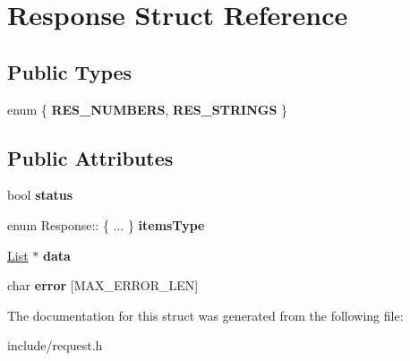 \hypertarget{struct_response}{}\section{Response Struct Reference}
\label{struct_response}
\subsection*{Public Types}
\begin{DoxyCompactItemize}
\item 
\mbox{\label{struct_response_a94f56f09486776e06ded23d740b31097}} 
enum \{ {\bfseries R\+E\+S\+\_\+\+N\+U\+M\+B\+E\+RS}, 
{\bfseries R\+E\+S\+\_\+\+S\+T\+R\+I\+N\+GS}
 \}
\end{DoxyCompactItemize}
\subsection*{Public Attributes}
\begin{DoxyCompactItemize}
\item 
\mbox{\label{struct_response_afbbc48eb7e4ab82337494ef5f716b590}} 
bool {\bfseries status}
\item 
\mbox{\label{struct_response_acec6e50d5ed5bc0c4a5358c805f7bf44}} 
enum Response\+:: \{ ... \}  {\bfseries items\+Type}
\item 
\mbox{\label{struct_response_a233099b61e541ff683bf7561a209e8b9}} 
\hyperlink{struct_list}{List} $\ast$ {\bfseries data}
\item 
\mbox{\label{struct_response_a9b5aac99ce11e3551fa41beb253120d8}} 
char {\bfseries error} \mbox{[}M\+A\+X\+\_\+\+E\+R\+R\+O\+R\+\_\+\+L\+EN\mbox{]}
\end{DoxyCompactItemize}


The documentation for this struct was generated from the following file\+:\begin{DoxyCompactItemize}
\item 
include/request.\+h\end{DoxyCompactItemize}
